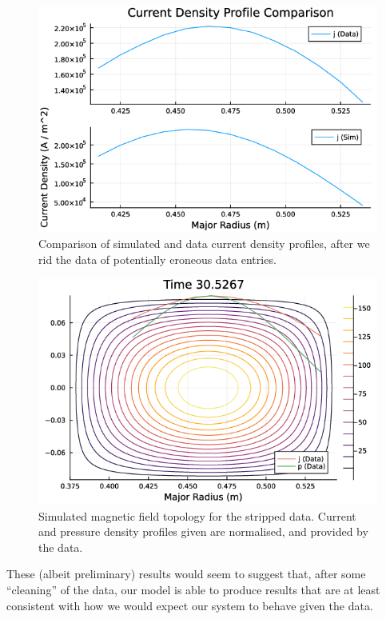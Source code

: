 \begin{figure}[h!]
    \centering
    \includegraphics[scale=0.65]{imgs/c5/comparison-current-edited-0.png}
    \caption{Comparison of simulated and data current density profiles, after we rid the data of potentially eroneous data entries.}
    \label{comparison-current-0-edited}
\end{figure}
\begin{figure}[h!]
    \centering
    \includegraphics[scale=0.65]{imgs/c5/mag-field-edited-data-0.png}
    \caption{Simulated magnetic field topology for the stripped data. Current and pressure density profiles given are normalised, 
    and provided by the data.}
    \label{mag-field-edited-data-0}
\end{figure}\newpage

These (albeit preliminary) results would seem to suggest that, after some ``cleaning'' of the data, our model is able to 
produce results that are at least consistent with how we would expect our system to behave given the data. 

